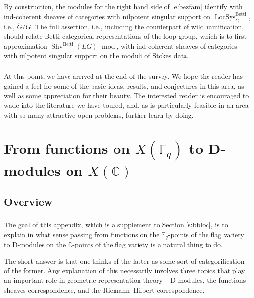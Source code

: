 \documentclass[10pt]{amsart}
\newcommand{\LS}{\on{LocSys}_{\cG}}
\newcommand{\on}{\operatorname}
\renewcommand{\mod}{\on{-mod}}
\newcommand{\Fq}{\mathbb{F}_q}
\theoremstyle{remark}
\newcommand{\CC}{\mathbb{C}}
\numberwithin{equation}{section}
\newcommand{\cG}{\check{G}}
\renewcommand{\mod}{\operatorname{-mod}}
\begin{document}
	By construction, the modules for the right hand side of \eqref{e:bezfam} 
	identify with ind-coherent sheaves of categories with nilpotent singular 
	support on $\LS^{\on{Betti}}$, i.e., $\cG / \cG$. The full assertion, i.e., 
	including the counterpart of wild ramification, 
	should relate Betti categorical representations of the 
	loop group, which is to first approximation 
	$\on{Shv}^{\on{Betti}}(LG)\mod$, 
	with ind-coherent sheaves of categories with nilpotent singular support on 
	the moduli of Stokes data. 
	  
	
	
	
	\subsubsection{} At this point, we have arrived at the end of the survey. We hope the reader has gained a feel for some of the basic ideas, results, and conjectures in this area, as well as some appreciation for their beauty. The interested reader is encouraged to wade into the literature we have toured, and, as is particularly feasible in an area with so many attractive open problems, further learn by doing. 
	
	
	
	
	
	\appendix
	
	
	
	
	
	\section{From functions on $X(\Fq)$ to D-modules on $X(\CC)$}
	\label{s:frmfun}
	
	\subsection{Overview}
	
	
	\subsubsection{} The goal of this appendix, which is a supplement to Section \ref{s:bbloc}, is to explain in what sense passing from functions on the $\Fq$-points of the flag variety to D-modules on the $\CC$-points of the flag variety is a natural thing to do. 
	
    The short answer is that one thinks of the latter as some sort of categorification of the former. Any explanation of this necessarily involves three topics that play an important role in geometric representation theory -- D-modules, the functions-sheaves correspondence, and the Riemann--Hilbert correspondence. 
    
\end{document}
